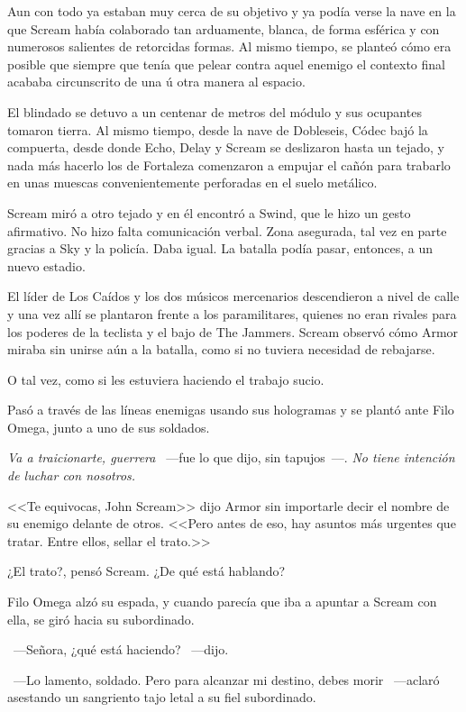Aun con todo ya estaban muy cerca de su objetivo y ya podía verse la nave en la que Scream había colaborado tan arduamente, blanca, de forma esférica y con numerosos salientes de retorcidas formas. Al mismo tiempo, se planteó cómo era posible que siempre que tenía que pelear contra aquel enemigo el contexto final acababa circunscrito de una ú otra manera al espacio.

El blindado se detuvo a un centenar de metros del módulo y sus ocupantes tomaron tierra. Al mismo tiempo, desde la nave de Dobleseis, Códec bajó la compuerta, desde donde Echo, Delay y Scream se deslizaron hasta un tejado, y nada más hacerlo los de Fortaleza comenzaron a empujar el cañón para trabarlo en unas muescas convenientemente perforadas en el suelo metálico.

Scream miró a otro tejado y en él encontró a Swind, que le hizo un gesto afirmativo. No hizo falta comunicación verbal. Zona asegurada, tal vez en parte gracias a Sky y la policía. Daba igual. La batalla podía pasar, entonces, a un nuevo estadio.

El líder de Los Caídos y los dos músicos mercenarios descendieron a nivel de calle y una vez allí se plantaron frente a los paramilitares, quienes no eran rivales para los poderes de la teclista y el bajo de The Jammers. Scream observó cómo Armor miraba sin unirse aún a la batalla, como si no tuviera necesidad de rebajarse.

O tal vez, como si les estuviera haciendo el trabajo sucio.

Pasó a través de las líneas enemigas usando sus hologramas y se plantó ante Filo Omega, junto a uno de sus soldados.

\emph{Va a traicionarte, guerrera} ~---fue lo que dijo, sin tapujos~---. \emph{No tiene intención de luchar con nosotros.}

<<Te equivocas, John Scream>> dijo Armor sin importarle decir el nombre de su enemigo delante de otros. <<Pero antes de eso, hay asuntos más urgentes que tratar. Entre ellos, sellar el trato.>>

¿El trato?, pensó Scream. ¿De qué está hablando?

Filo Omega alzó su espada, y cuando parecía que iba a apuntar a Scream con ella, se giró hacia su subordinado.

~---Señora, ¿qué está haciendo? ~---dijo.

~---Lo lamento, soldado. Pero para alcanzar mi destino, debes morir ~---aclaró asestando un sangriento tajo letal a su fiel subordinado.

